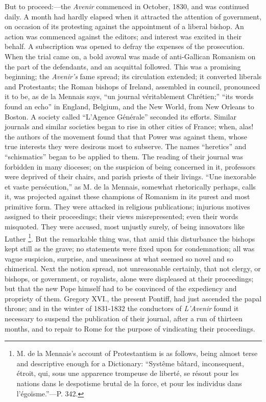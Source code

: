 But to proceed:—the \emph{Avenir} commenced in
October, 1830, and was continued daily. A month had hardly elapsed
when it attracted the attention of government, on occasion of its
protesting against the appointment of a liberal bishop. An action was
commenced against the editors; and interest was excited in their
behalf. A subscription was opened to defray the expenses of the
prosecution. When the trial came on, a bold avowal was made of anti-Gallican
Romanism on the part of the defendants, and an acquittal followed.
This was a promising beginning; the \emph{Avenir's} fame spread; its
circulation extended; it converted liberals and Protestants; the Roman
bishops of Ireland, assembled in council, pronounced it to be, as de
la Mennais says, ``un journal véritablement Chrétien;'' ``its words
found an echo'' in England, Belgium, and the New World, from New
Orleans to Boston. A society called ``L'Agence Générale'' seconded its
efforts. Similar journals and similar societies began to rise in other
cities of France; when, alas! the authors of the movement found that
that Power was against them, whose true interests they were desirous
most to subserve. The names ``heretics'' and ``schismatics'' began to be
applied to them. The reading of their journal was forbidden in many
dioceses; on the suspicion of being concerned in it, professors were
deprived of their chairs, and parish priests of their livings. ``Une
inexorable et vaste persécution,'' as M. de la Mennais, somewhat
rhetorically perhaps, calls it, was projected against these champions
of Romanism in its purest and most primitive form. They were attacked
in religious publications; injurious motives assigned to their
proceedings; their views misrepresented; even their words misquoted.
They were accused, most unjustly surely, of being innovators like
Luther \footnote{M. de la Mennais's account of Protestantism is as follows, being
almost terse and descriptive enough for a Dictionary: ``Systême bâtard,
inconsequent, étroit, qui, sous une apparence trompeuse de liberté,
se résout pour les nations dans le despotisme brutal de la force, et
pour les individus dans l'égoïsme.''—P. 342.}. But the
remarkable thing was, that amid this disturbance the bishops kept
still as the grave; no statements were fixed upon for condemnation;
all was vague suspicion, surprise, and uneasiness at what seemed so
novel and so chimerical. Next the notion spread, not unreasonable
certainly, that not clergy, or bishops, or government, or royalists,
alone were displeased at their proceedings; but that the new Pope
himself had to be convinced of the expediency and propriety of them.
Gregory XVI., the present Pontiff, had just ascended the papal throne;
and in the winter of 1831-1832 the conductors of \emph{L'Avenir}
found it necessary to suspend the publication of their journal, after
a run of thirteen months, and to repair to Rome for the purpose of
vindicating their proceedings.

